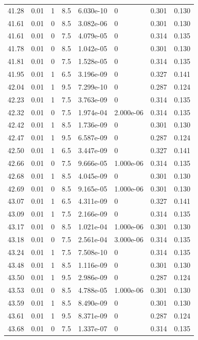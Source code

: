 \documentclass[preview]{standalone}
\begin{document}
{{{{{{{{{{{{\begin{tabular}{L{1.2cm}C{1.2cm} C{0.3cm}C{0.5cm} C{1.4cm}C{1.4cm} C{1.4cm}C{1.4cm}}
  41.28  &  0.01  & 1     & 8.5 &  6.030e-10  & 0  & 0.301 &  0.130   \\ 
  41.61  &  0.01  & 0     & 8.5 &  3.082e-06  & 0  & 0.301 &  0.130   \\ 
  41.61  &  0.01  & 0     & 7.5 &  4.079e-05  & 0  & 0.314 &  0.135   \\ 
  41.78  &  0.01  & 0     & 8.5 &  1.042e-05  & 0  & 0.301 &  0.130   \\ 
  41.81  &  0.01  & 0     & 7.5 &  1.528e-05  & 0  & 0.314 &  0.135   \\ 
  41.95  &  0.01  & 1     & 6.5 &  3.196e-09  & 0  & 0.327 &  0.141   \\ 
  42.04  &  0.01  & 1     & 9.5 &  7.299e-10  & 0  & 0.287 &  0.124   \\ 
  42.23  &  0.01  & 1     & 7.5 &  3.763e-09  & 0  & 0.314 &  0.135   \\ 
  42.32  &  0.01  & 0     & 7.5 &  1.974e-04  & 2.000e-06  & 0.314 &  0.135   \\ 
  42.42  &  0.01  & 1     & 8.5 &  1.736e-09  & 0  & 0.301 &  0.130   \\ 
  42.47  &  0.01  & 1     & 9.5 &  6.587e-09  & 0  & 0.287 &  0.124   \\ 
  42.50  &  0.01  & 1     & 6.5 &  3.447e-09  & 0  & 0.327 &  0.141   \\ 
  42.66  &  0.01  & 0     & 7.5 &  9.666e-05  & 1.000e-06  & 0.314 &  0.135   \\ 
  42.68  &  0.01  & 1     & 8.5 &  4.045e-09  & 0  & 0.301 &  0.130   \\ 
  42.69  &  0.01  & 0     & 8.5 &  9.165e-05  & 1.000e-06  & 0.301 &  0.130   \\ 
  43.07  &  0.01  & 1     & 6.5 &  4.311e-09  & 0  & 0.327 &  0.141   \\ 
  43.09  &  0.01  & 1     & 7.5 &  2.166e-09  & 0  & 0.314 &  0.135   \\ 
  43.17  &  0.01  & 0     & 8.5 &  1.021e-04  & 1.000e-06  & 0.301 &  0.130   \\ 
  43.18  &  0.01  & 0     & 7.5 &  2.561e-04  & 3.000e-06  & 0.314 &  0.135   \\ 
  43.24  &  0.01  & 1     & 7.5 &  7.508e-10  & 0  & 0.314 &  0.135   \\ 
  43.48  &  0.01  & 1     & 8.5 &  1.116e-09  & 0  & 0.301 &  0.130   \\ 
  43.50  &  0.01  & 1     & 9.5 &  2.986e-09  & 0  & 0.287 &  0.124   \\ 
  43.53  &  0.01  & 0     & 8.5 &  4.788e-05  & 1.000e-06  & 0.301 &  0.130   \\ 
  43.59  &  0.01  & 1     & 8.5 &  8.490e-09  & 0  & 0.301 &  0.130   \\ 
  43.61  &  0.01  & 1     & 9.5 &  8.371e-09  & 0  & 0.287 &  0.124   \\ 
  43.68  &  0.01  & 0     & 7.5 &  1.337e-07  & 0  & 0.314 &  0.135   \\ 
\hline 
\end{tabular} 

}}}}}}}}}}}}
\end{document}
